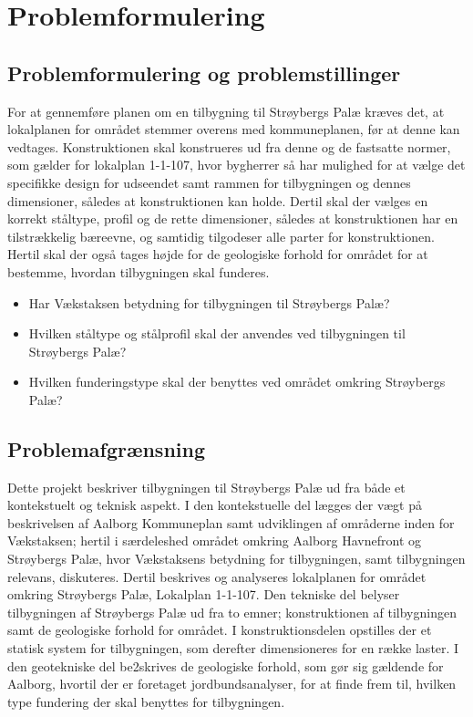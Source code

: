 \chapter{Problemformulering}

\section{Problemformulering og problemstillinger}
For at gennemføre planen om en tilbygning til Strøybergs Palæ kræves det, at lokalplanen for området stemmer overens med kommuneplanen, før at denne kan vedtages. Konstruktionen skal konstrueres ud fra denne og de fastsatte normer, som gælder for lokalplan 1-1-107, hvor bygherrer så har mulighed for at vælge det specifikke design for udseendet samt rammen for tilbygningen og dennes dimensioner, således at konstruktionen kan holde. Dertil skal der vælges en korrekt ståltype, profil og de rette dimensioner, således at konstruktionen har en tilstrækkelig bæreevne, og samtidig tilgodeser alle parter for konstruktionen. Hertil skal der også tages højde for de geologiske forhold for området for at bestemme, hvordan tilbygningen skal funderes. 


\begin{itemize} 
	\item Har Vækstaksen betydning for tilbygningen til Strøybergs Palæ?
	\item Hvilken ståltype og stålprofil skal der anvendes ved tilbygningen til Strøybergs Palæ? 
	\item Hvilken funderingstype skal der benyttes ved området omkring Strøybergs Palæ? 
\end{itemize} 

\section{Problemafgrænsning}
Dette projekt beskriver tilbygningen til Strøybergs Palæ ud fra både et kontekstuelt og teknisk aspekt. I den kontekstuelle del lægges der vægt på beskrivelsen af Aalborg Kommuneplan samt udviklingen af områderne inden for Vækstaksen; hertil i særdeleshed området omkring Aalborg Havnefront og Strøybergs Palæ, hvor Vækstaksens betydning for tilbygningen, samt tilbygningen relevans, diskuteres. Dertil beskrives og analyseres lokalplanen for området omkring Strøybergs Palæ, Lokalplan 1-1-107.
\newline \indent{     }  Den tekniske del belyser tilbygningen af Strøybergs Palæ ud fra to emner; konstruktionen af tilbygningen samt de geologiske forhold for området. 
\newline \indent{     }  I konstruktionsdelen opstilles der et statisk system for tilbygningen, som derefter dimensioneres for en række laster. 
\newline \indent{     }  I den geotekniske del be2skrives de geologiske forhold, som gør sig gældende for Aalborg, hvortil der er foretaget jordbundsanalyser, for at finde frem til, hvilken type fundering der skal benyttes for tilbygningen.  